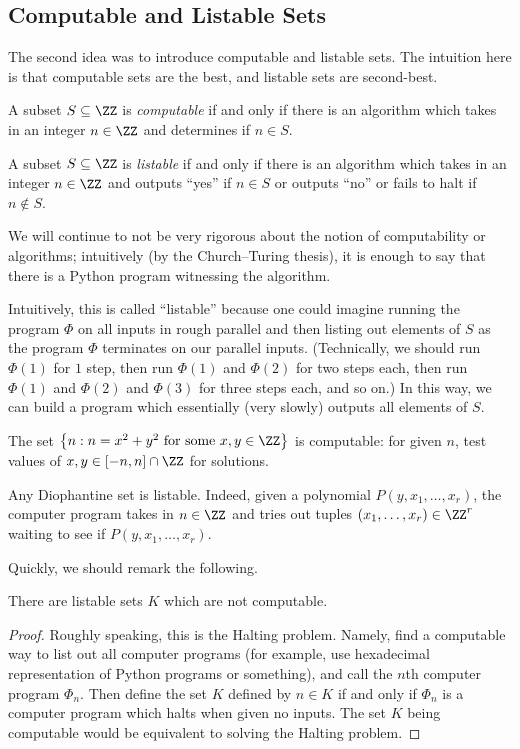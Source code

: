 \documentclass{article}
\begin{document}
\subsection{Computable and Listable Sets}
The second idea was to introduce computable and listable sets. The intuition here is that computable sets are the best, and listable sets are second-best.
\begin{definition}[computable]
	A subset $S\subseteq\ZZ$ is \textit{computable} if and only if there is an algorithm which takes in an integer $n\in\ZZ$ and determines if $n\in S$.
\end{definition}
\begin{definition}[listable]
	A subset $S\subseteq\ZZ$ is \textit{listable} if and only if there is an algorithm which takes in an integer $n\in\ZZ$ and outputs ``yes'' if $n\in S$ or outputs ``no'' or fails to halt if $n\notin S$.
\end{definition}
We will continue to not be very rigorous about the notion of computability or algorithms; intuitively (by the Church--Turing thesis), it is enough to say that there is a Python program witnessing the algorithm.
\begin{remark}
	Intuitively, this is called ``listable'' because one could imagine running the program $\Phi$ on all inputs in rough parallel and then listing out elements of $S$ as the program $\Phi$ terminates on our parallel inputs. (Technically, we should run $\Phi(1)$ for $1$ step, then run $\Phi(1)$ and $\Phi(2)$ for two steps each, then run $\Phi(1)$ and $\Phi(2)$ and $\Phi(3)$ for three steps each, and so on.) In this way, we can build a program which essentially (very slowly) outputs all elements of $S$.
\end{remark}
\begin{example}
	The set $\left\{n:n=x^2+y^2\text{ for some }x,y\in\ZZ\right\}$ is computable: for given $n$, test values of $x,y\in[-n,n]\cap\ZZ$ for solutions.
\end{example}
\begin{example} \label{ex:diophantine-is-listable}
	Any Diophantine set is listable. Indeed, given a polynomial $P(y,x_1,\ldots,x_r)$, the computer program takes in $n\in\ZZ$ and tries out tuples $(x_1,\ldots,x_r)\in\ZZ^r$ waiting to see if $P(y,x_1,\ldots,x_r)$.
\end{example}
Quickly, we should remark the following.
\begin{proposition} \label{prop:listable-not-computable}
	There are listable sets $K$ which are not computable.
\end{proposition}
\begin{proof}
	Roughly speaking, this is the Halting problem. Namely, find a computable way to list out all computer programs (for example, use hexadecimal representation of Python programs or something), and call the $n$th computer program $\Phi_n$. Then define the set $K$ defined by $n\in K$ if and only if $\Phi_n$ is a computer program which halts when given no inputs. The set $K$ being computable would be equivalent to solving the Halting problem.
\end{proof}
\end{document}
